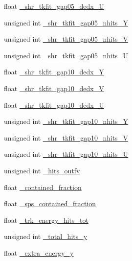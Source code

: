 \begin{DoxyCompactItemize}
\item 
float \hyperlink{classselection_1_1CC0piNpSelection_ad0504ef7cf7c8fa5a0059fbaedd6861b}{\+\_\+shr\+\_\+tkfit\+\_\+gap05\+\_\+dedx\+\_\+U}
\item 
unsigned int \hyperlink{classselection_1_1CC0piNpSelection_a91054bcbcb38dd0684fe810167c7146f}{\+\_\+shr\+\_\+tkfit\+\_\+gap05\+\_\+nhits\+\_\+Y}
\item 
unsigned int \hyperlink{classselection_1_1CC0piNpSelection_a515d1b21ecb57c0177501823b5ec2568}{\+\_\+shr\+\_\+tkfit\+\_\+gap05\+\_\+nhits\+\_\+V}
\item 
unsigned int \hyperlink{classselection_1_1CC0piNpSelection_a06b5781f09cf3c5129efad982fa3c210}{\+\_\+shr\+\_\+tkfit\+\_\+gap05\+\_\+nhits\+\_\+U}
\item 
float \hyperlink{classselection_1_1CC0piNpSelection_ae4ccdcc53f1b3e72cb360af8af316eb8}{\+\_\+shr\+\_\+tkfit\+\_\+gap10\+\_\+dedx\+\_\+Y}
\item 
float \hyperlink{classselection_1_1CC0piNpSelection_adf21374d01634ceeb71cdcb954c40b98}{\+\_\+shr\+\_\+tkfit\+\_\+gap10\+\_\+dedx\+\_\+V}
\item 
float \hyperlink{classselection_1_1CC0piNpSelection_a3b32a837b2388327cee3eb07ad25a557}{\+\_\+shr\+\_\+tkfit\+\_\+gap10\+\_\+dedx\+\_\+U}
\item 
unsigned int \hyperlink{classselection_1_1CC0piNpSelection_ac4f7286273aa34122aa80e6dbf34b9f7}{\+\_\+shr\+\_\+tkfit\+\_\+gap10\+\_\+nhits\+\_\+Y}
\item 
unsigned int \hyperlink{classselection_1_1CC0piNpSelection_a1dac5397a17c360ce67831fa3ed8aed5}{\+\_\+shr\+\_\+tkfit\+\_\+gap10\+\_\+nhits\+\_\+V}
\item 
unsigned int \hyperlink{classselection_1_1CC0piNpSelection_ae639e53ae1ea9c2bed506ca5d2e5c486}{\+\_\+shr\+\_\+tkfit\+\_\+gap10\+\_\+nhits\+\_\+U}
\item 
unsigned int \hyperlink{classselection_1_1CC0piNpSelection_ac39ec79d190fb925f8d20b03cbeb0605}{\+\_\+hits\+\_\+outfv}
\item 
float \hyperlink{classselection_1_1CC0piNpSelection_a8e7933222bce1424aee24bae8dcf4864}{\+\_\+contained\+\_\+fraction}
\item 
float \hyperlink{classselection_1_1CC0piNpSelection_ac425fa284847d7cae95f21367ed4889e}{\+\_\+sps\+\_\+contained\+\_\+fraction}
\item 
float \hyperlink{classselection_1_1CC0piNpSelection_a82a48c6128c34252642d237b98f1b66a}{\+\_\+trk\+\_\+energy\+\_\+hits\+\_\+tot}
\item 
unsigned int \hyperlink{classselection_1_1CC0piNpSelection_a819d1d973e74bcd2ad82aa01ea24ac37}{\+\_\+total\+\_\+hits\+\_\+y}
\item 
float \hyperlink{classselection_1_1CC0piNpSelection_a2e386c361ecc27d22ff2642e80a629e4}{\+\_\+extra\+\_\+energy\+\_\+y}
\end{DoxyCompactItemize}
